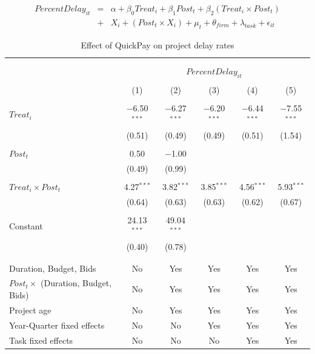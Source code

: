 \documentclass[
]{article}
\begin{document}
\[ \begin{aligned} PercentDelay_{it} &=& \alpha+\beta_0 Treat_i + \beta_1 Post_t + \beta_2 (Treat_i \times Post_t)\\
&+&  X_i + (Post_t \times X_i) + \mu_t + \theta_{firm} + \lambda_{task}+ \epsilon_{it}
\end{aligned}\]

\begin{table}[H] \centering 
  \caption{Effect of QuickPay on project delay rates} 
  \label{} 
\small 
\begin{tabular}{@{\extracolsep{-2pt}}lccccc} 
\\[-1.8ex]\hline 
\hline \\[-1.8ex] 
\\[-1.8ex] & \multicolumn{5}{c}{$PercentDelay_{it}$} \\ 
\\[-1.8ex] & (1) & (2) & (3) & (4) & (5)\\ 
\hline \\[-1.8ex] 
 $Treat_i$ & $-$6.50$^{***}$ & $-$6.27$^{***}$ & $-$6.20$^{***}$ & $-$6.44$^{***}$ & $-$7.55$^{***}$ \\ 
  & (0.51) & (0.49) & (0.49) & (0.51) & (1.54) \\ 
  & & & & & \\ 
 $Post_t$ & 0.50 & $-$1.00 &  &  &  \\ 
  & (0.49) & (0.99) &  &  &  \\ 
  & & & & & \\ 
 $Treat_i \times Post_t$ & 4.27$^{***}$ & 3.82$^{***}$ & 3.85$^{***}$ & 4.56$^{***}$ & 5.93$^{***}$ \\ 
  & (0.64) & (0.63) & (0.63) & (0.62) & (0.67) \\ 
  & & & & & \\ 
 Constant & 24.13$^{***}$ & 49.04$^{***}$ &  &  &  \\ 
  & (0.40) & (0.78) &  &  &  \\ 
  & & & & & \\ 
\hline \\[-1.8ex] 
Duration, Budget, Bids & No & Yes & Yes & Yes & Yes \\ 
$Post_t \times$  (Duration, Budget, Bids) & No & Yes & Yes & Yes & Yes \\ 
Project age & No & Yes & Yes & Yes & Yes \\ 
Year-Quarter fixed effects & No & No & Yes & Yes & Yes \\ 
Task fixed effects & No & No & No & Yes & Yes \\ 

\end{tabular}
\end{table}
\end{document}
